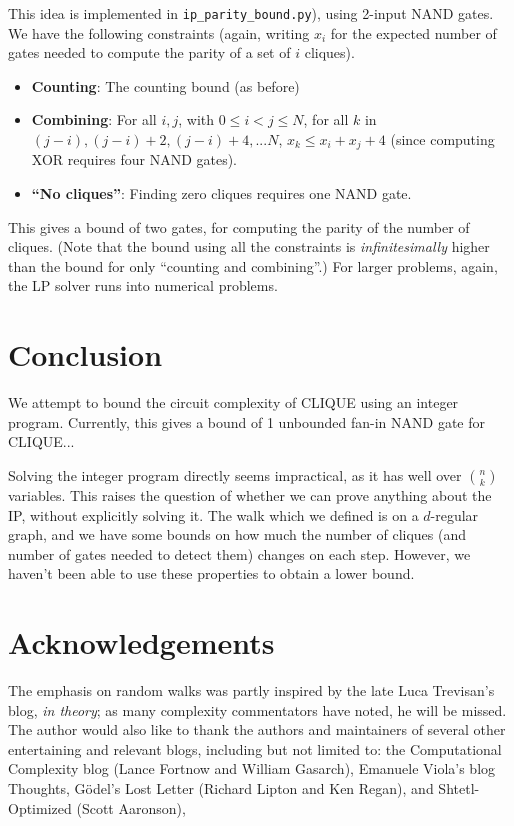 \documentclass[12pt]{article}
\theoremstyle{definition}
\begin{document}
This idea is implemented in {\tt ip\_parity\_bound.py}), using 2-input NAND gates.
We have the following constraints (again, writing $x_i$ for the expected number
of gates needed to compute the parity of a set of $i$ cliques).

\begin{itemize}

\item {\bf Counting}: The counting bound (as before)

\item {\bf Combining}: For all $i, j$, with $0 \le i < j \le N$, for
all $k$ in $(j-i), (j-i)+2, (j-i)+4, ... N$, $x_k \le x_i + x_j + 4$ (since
computing XOR requires four NAND gates).

\item {\bf ``No cliques''}: Finding zero cliques requires one NAND gate.

\end{itemize}

This gives a bound of two gates, for computing the parity of
the number of cliques. (Note that the bound using all the constraints is
{\em infinitesimally} higher than the bound for only ``counting and combining''.)
For larger problems, again, the LP solver runs into
numerical problems.

\section{Conclusion}

We attempt to bound the circuit complexity of CLIQUE using an integer program.
Currently, this gives a bound
of 1 unbounded fan-in NAND gate for CLIQUE...

Solving the integer program directly seems impractical, as it has well over
${n \choose k}$ variables. This raises the question of whether we can prove
anything about the IP, without explicitly solving it.
The walk which we defined is on a $d$-regular graph, and we have some bounds on
how much the number of cliques (and number of gates needed to detect them)
changes on each step. However, we haven't been able to use these properties
to obtain a lower bound.

\section{Acknowledgements}

The emphasis on random walks was partly inspired by the late Luca
Trevisan's blog, {\em in theory}; as many complexity commentators
have noted, he will be missed. The author would also like to thank
the authors and maintainers of several other entertaining and
relevant blogs, including but not limited to: the Computational
Complexity blog (Lance Fortnow and William Gasarch), Emanuele Viola's
blog Thoughts, G\"odel's Lost Letter (Richard Lipton and Ken Regan),
and Shtetl-Optimized (Scott Aaronson),



\end{document}
